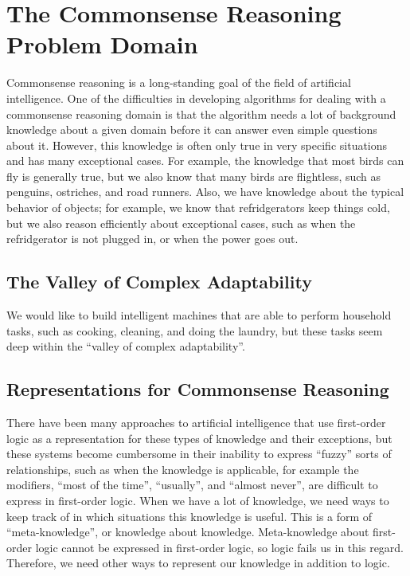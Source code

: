 \section{The Commonsense Reasoning Problem Domain}

Commonsense reasoning is a long-standing goal of the field of
artificial intelligence.  One of the difficulties in developing
algorithms for dealing with a commonsense reasoning domain is that the
algorithm needs a lot of background knowledge about a given domain
before it can answer even simple questions about it.  However, this
knowledge is often only true in very specific situations and has many
exceptional cases.  For example, the knowledge that most birds can fly
is generally true, but we also know that many birds are flightless,
such as penguins, ostriches, and road runners.  Also, we have
knowledge about the typical behavior of objects; for example, we know
that refridgerators keep things cold, but we also reason efficiently
about exceptional cases, such as when the refridgerator is not plugged
in, or when the power goes out.

\subsection{The Valley of Complex Adaptability}

We would like to build intelligent machines that are able to perform
household tasks, such as cooking, cleaning, and doing the laundry, but
these tasks seem deep within the ``valley of complex adaptability''.


\subsection{Representations for Commonsense Reasoning}

There have been many approaches to artificial intelligence that use
first-order logic as a representation for these types of knowledge and
their exceptions, but these systems become cumbersome in their
inability to express ``fuzzy'' sorts of relationships, such as when
the knowledge is applicable, for example the modifiers, ``most of the
time'', ``usually'', and ``almost never'', are difficult to express in
first-order logic.  When we have a lot of knowledge, we need ways to
keep track of in which situations this knowledge is useful.  This is a
form of ``meta-knowledge'', or knowledge about knowledge.
Meta-knowledge about first-order logic cannot be expressed in
first-order logic, so logic fails us in this regard.  Therefore, we
need other ways to represent our knowledge in addition to logic.

